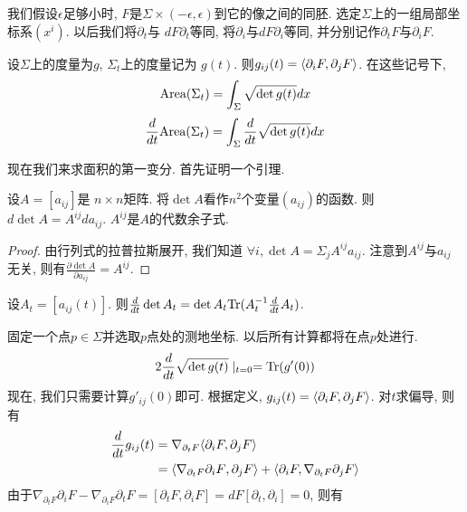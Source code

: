 \begin{remark}
    我们假设$\epsilon$足够小时, $F$是$\Sigma \times (-\epsilon,\epsilon)$到它的像之间的同胚. 选定$\Sigma$上的一组局部坐标系$(x^i)$. 以后我们将$\partial_t$与 $dF\partial_t$等同, 将$\partial_i$与$dF\partial_i$等同, 并分别记作$\partial_t F$与$\partial_i F$.
\end{remark}
设$\Sigma$上的度量为$g$, $\Sigma_t$上的度量记为 $g(t)$. 则$g_{ij}(t)={\left < \partial_iF, \partial_jF \right >}$. 在这些记号下, 
\begin{equation}
    \text{Area}(\Sigma_t)=\int_\Sigma \sqrt{\det g(t)}dx
\end{equation}
\begin{equation}
    \frac{d}{dt} \text{Area}(\Sigma_t)=\int_\Sigma \frac{d}{dt} \sqrt{\det g(t)}dx
\end{equation}
\par 现在我们来求面积的第一变分. 首先证明一个引理.
\begin{lemma}
    设$A=[a_{ij}]$是 $n \times n$矩阵. 将$\det A$看作$n^2$个变量$(a_{ij})$的函数. 则$d\det A= A^{ij}da_{ij}$. $A^{ij}$是$A$的代数余子式.
\end{lemma}
\begin{proof}
    由行列式的拉普拉斯展开, 我们知道 $\forall i, \det A= \Sigma_{j}A^{ij}a_{ij}$. 注意到$A^{ij}$与${a_{ij}}$无关, 则有$\frac{\partial \det A}{\partial a_{ij}}=A^{ij}$.
\end{proof}
\begin{corollary} \label{det_jacobi}
    设$A_t=[a_{ij}(t)]$. 则$\frac{d}{dt} \det A_t=\det A_t \text{Tr}(A_t^{-1}\frac{d}{dt} A_t)$.
\end{corollary}
固定一个点$p \in \Sigma$并选取$p$点处的测地坐标. 以后所有计算都将在点$p$处进行.
\begin{equation}
    2\frac{d}{dt} \sqrt{\det g(t)}\mid_{t=0}=\text{Tr}(g'(0))
\end{equation}
现在, 我们只需要计算$g'_{ij}(0)$即可. 根据定义, $g_{ij}(t)={\left < \partial_iF, \partial_jF \right >}$. 对$t$求偏导, 则有
\begin{equation}
    \begin{split}
        \frac{d}{dt} g_{ij}(t)& =\nabla_{\partial_t F}{\left < \partial_iF, \partial_jF \right >} \\
                    & ={\left < \nabla_{\partial_t F}{\partial_iF}, \partial_jF \right >}+ {\left < \partial_iF, \nabla_{\partial_tF}\partial_jF \right >}
    \end{split}
\end{equation}
由于$\nabla_{\partial_tF}\partial_iF - \nabla_{\partial_iF} \partial_tF=[\partial_tF,\partial_iF]=dF[\partial_t,\partial_i]=0$, 则有

